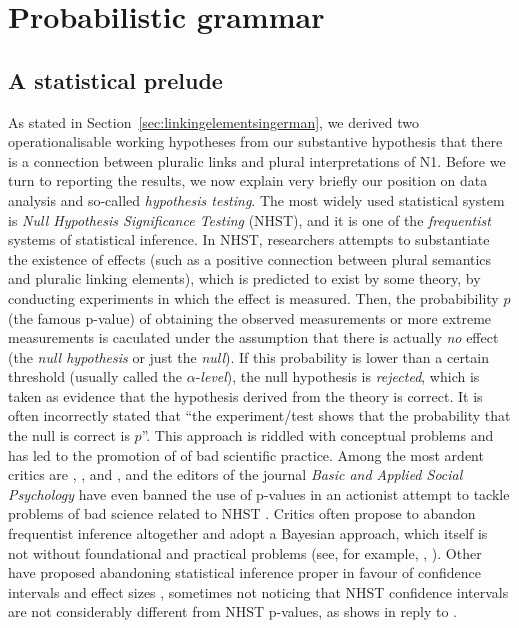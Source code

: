 \section{Probabilistic grammar}
\label{sec:probabilisticgrammar}


\subsection{A statistical prelude}
\label{ssub:astatisticalprelude}

As stated in Section~\ref{sec:linkingelementsingerman}, we derived two operationalisable working hypotheses from our substantive hypothesis that there is a connection between pluralic links and plural interpretations of N1.
Before we turn to reporting the results, we now explain very briefly our position on data analysis and so-called \textit{hypothesis testing}.
The most widely used statistical system is \textit{Null Hypothesis Significance Testing} (NHST), and it is one of the \textit{frequentist} systems of statistical inference.
In NHST, researchers attempts to substantiate the existence of effects (such as a positive connection between plural semantics and pluralic linking elements), which is predicted to exist by some theory, by conducting experiments in which the effect is measured.
Then, the probabibility $p$ (the famous p-value) of obtaining the observed measurements or more extreme measurements is caculated under the assumption that there is actually \textit{no} effect (the \textit{null hypothesis} or just the \textit{null}).
If this probability is lower than a certain threshold (usually called the $\alpha$-\textit{level}), the null hypothesis is \textit{rejected}, which is taken as evidence that the hypothesis derived from the theory is correct.
It is often incorrectly stated that ``the experiment\slash test shows that the probability that the null is correct is $p$''.
This approach is riddled with conceptual problems and has led to the promotion of of bad scientific practice.
Among the most ardent critics are \textcite{Gigerenzer2004}, \textcite{Colquhoun2014}, and \textcite{MunafoEa2017}, and the editors of the journal \textit{Basic and Applied Social Psychology} have even banned the use of p-values in an actionist attempt to tackle problems of bad science related to NHST \parencite{TrafimowMarks2016}.
Critics often propose to abandon frequentist inference altogether and adopt a Bayesian approach, which itself is not without foundational and practical problems (see, for example, \citealt{Mayo1996}, \citealt{Senn2011}).
Other have proposed abandoning statistical inference proper in favour of confidence intervals and effect sizes \parencite{Cumming2014}, sometimes not noticing that NHST confidence intervals are not considerably different from NHST p-values, as \textcite{Perezgonzalez2015b} shows in reply to \textcite{Cumming2014}.

